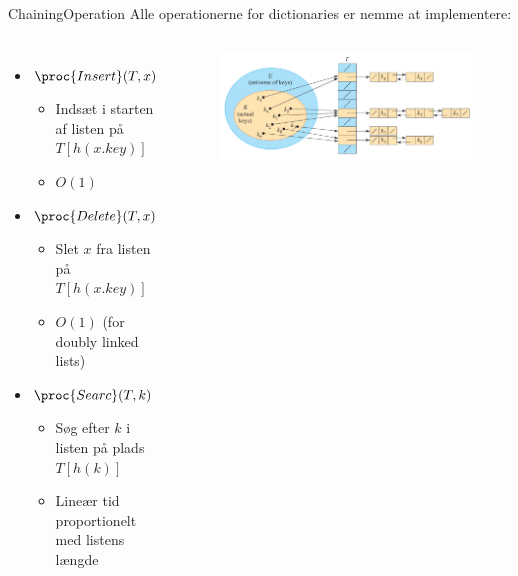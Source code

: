 \documentclass[aspectratio=1610]{beamer}
\begin{document}
\begin{frame}{Chaining}{Operation}
    Alle operationerne for dictionaries er nemme at implementere:

    \begin{columns}
        \begin{itemize}
            \small
            \item<2-> $\proc{Insert}(T,x)$
                \begin{itemize}
                    \item Indsæt i starten af listen på $T[h(x.key)]$
                    \item $O(1)$
                \end{itemize}
            \item<3-> $\proc{Delete}(T,x)$
                \begin{itemize}
                    \item Slet $x$ fra listen på $T[h(x.key)]$
                    \item $O(1)$ (for doubly linked lists)
                \end{itemize}
            \item<4-> $\proc{Searc}(T,k)$
                \begin{itemize}
                    \item Søg efter $k$ i listen på plads $T[h(k)]$
                    \item Lineær tid proportionelt med listens længde
                \end{itemize}
        \end{itemize}
    
        \begin{figure}[h]
            \centering
            \includegraphics[width=\textwidth]{chaining}
        \end{figure}
    \end{columns}
\end{frame}
\end{document}
